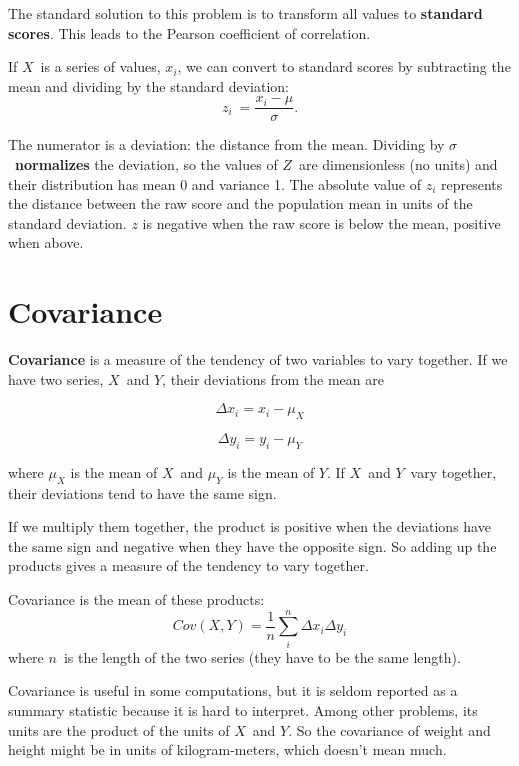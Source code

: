The standard solution to this problem is to transform all values to {\bf standard scores}.  This leads to
the Pearson coefficient of correlation.




If $X$~is a series of values, $x_i$, we can convert to standard
scores by subtracting the mean and dividing by the standard deviation:
\[ z_{i}~=\frac{x_{i}-\mu}{\sigma}. \]

The numerator is a deviation: the distance from the mean.  Dividing by
$\sigma$~{\bf normalizes} the deviation, so the values of $Z$~are
dimensionless (no units) and their distribution has mean 0 and
variance 1.
The absolute value of $z_i$ represents the distance between the raw score and the population mean in units of the standard deviation.
$z$ is negative when the raw score is below the mean, positive when above.


\section{Covariance}

{\bf Covariance} is a measure of the tendency of two variables
to vary together.  If we have two series, $X$~and $Y$, their
deviations from the mean are

\[ \Delta x_{i} = x_i-\mu_X \]

\[ \Delta y_{i} = y_i-\mu_Y \]

where $\mu_{X}$ is the mean of $X$~and $\mu_{Y}$ is the mean of $Y$.
If $X$~and $Y$~vary together, their deviations tend to have the same
sign.

If we multiply them together, the product is positive when the
deviations have the same sign and negative when they have the opposite
sign.  So adding up the products gives a measure of the tendency to
vary together.

Covariance is the mean of these products:
%
\[ Cov(X,Y) = \frac{1}{n} \sum_{i}^{n} \Delta x_i  \Delta y_i \]
%
where $n$~is the length of the two series (they have to be the same
length).

Covariance is useful in some computations, but
it is seldom reported as a summary statistic because it is hard to
interpret.  Among other problems, its units are the product of the
units of $X$~and $Y$.  So the covariance of weight and height might be
in units of kilogram-meters, which doesn't mean much.


